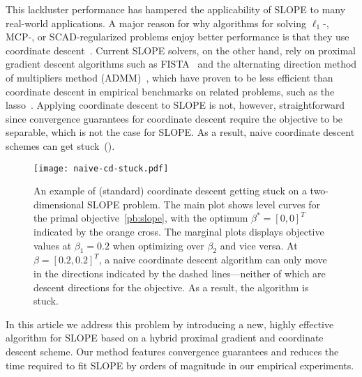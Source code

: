 This lackluster performance has hampered the applicability of SLOPE to many
real-world applications. A major reason for why algorithms for solving
$\ell_1$-, MCP-, or SCAD-regularized problems enjoy better performance is that
they use coordinate
descent~\parencite{tseng2001convergence,friedman2010,breheny2011}. Current SLOPE
solvers, on the other hand, rely on proximal gradient descent algorithms such
as FISTA~\parencite{beck2009} and the alternating direction method of multipliers
method (ADMM)~\parencite{boyd2010}, which have proven to be less efficient than
coordinate descent in empirical benchmarks on related problems, such as the
lasso~\parencite{moreau2022benchopt}. Applying coordinate descent to SLOPE is not,
however, straightforward since convergence guarantees for coordinate descent
require the objective to be separable, which is not the case for SLOPE. As a
result, naive coordinate descent schemes can get
stuck~().

\begin{figure}[htb]
  \centering
  \texttt{[image: naive-cd-stuck.pdf]}
  \caption{%
    An example of (standard) coordinate descent getting stuck on a two-dimensional SLOPE problem.
    The main plot shows level curves for the primal objective~\eqref{pb:slope}, with the optimum \(\beta^* = [0, 0]^T\) indicated by the orange cross.
    The marginal plots displays objective values at \(\beta_1 = 0.2\) when optimizing over \(\beta_2\) and vice versa.
    At \(\beta = [0.2,0.2]^T\), a naive coordinate descent algorithm can only move in the directions indicated by the dashed lines---neither of which are descent directions for the objective.
    As a result, the algorithm is stuck.
  }
  \label{fig:naive-cd-stuck}
\end{figure}

In this article we address this problem by introducing a new, highly effective
algorithm for SLOPE based on a hybrid proximal gradient and coordinate descent
scheme. Our method features convergence guarantees and reduces the time
required to fit SLOPE by orders of magnitude in our empirical experiments.
